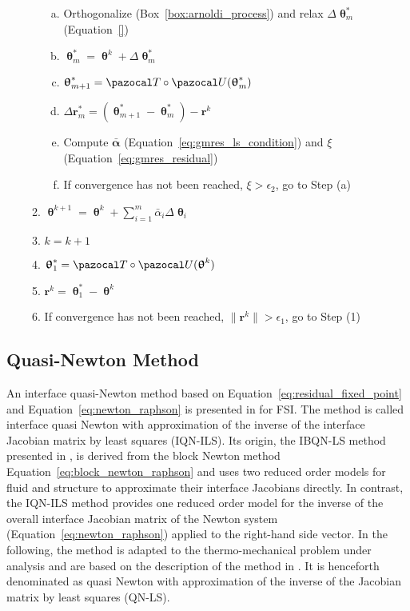 \begin{framedbox}[htbp]
\begin{center}
\begin{minipage}{0.9\textwidth}
\begin{enumerate}[(i)]
\begin{enumerate}[(1)]
\begin{enumerate}[(a)]
        \item Orthogonalize (Box~\ref{box:arnoldi_process}) and relax \(\Delta \bm\uptheta^*_m\) (Equation~\eqref{})
        \item \(\bm\uptheta^*_m = \bm\uptheta^k + \Delta\bm\uptheta^*_m\)
        \item \(\bm \uptheta^*_{m+1} = \pazocal T \circ \pazocal U(\bm \uptheta^*_m)\)
        \item \(\Delta \mathbf r^*_m = (\bm\uptheta^*_{m+1} - \bm \uptheta^*_m) - \mathbf r^k\)
        \item Compute \(\bar{\mathbf\alpha}\) (Equation~\eqref{eq:gmres_ls_condition}) and \(\xi\) (Equation~\eqref{eq:gmres_residual})
        \item If convergence has not been reached, \(\xi>\epsilon_2\), go to Step (a)
      \end{enumerate}
    \item \(\bm\uptheta^{k+1} = \bm\uptheta^k + \sum_{i=1}^m \bar{\alpha}_i \Delta\bm\uptheta_i\)
    \item \(k=k+1\)
    \item \(\bm\uptheta^*_1 = \pazocal T\circ \pazocal U(\bm\uptheta^{k})\)
    \item \(\mathbf r^k = \bm\uptheta^*_1 - \bm \uptheta^k\)
    \item If convergence has not been reached, \(\|\mathbf r^k\| > \epsilon_1\), go to Step (1)
    \end{enumerate}
    \end{enumerate}
    \end{minipage}
  \end{center}
\end{framedbox}


\subsection{Quasi-Newton Method}

An interface quasi-Newton method based on Equation~\eqref{eq:residual_fixed_point} and Equation~\eqref{eq:newton_raphson} is presented in \cite{degroote_joris_development_2010} for FSI.
The method is called interface quasi Newton with approximation of the inverse of the interface Jacobian matrix by least squares (IQN-ILS).
Its origin, the IBQN-LS method presented in \cite{vierendeels_implicit_2007}, is derived from the block Newton method Equation~\eqref{eq:block_newton_raphson} and uses two reduced order models for fluid and structure to approximate their interface Jacobians directly.
In contrast, the IQN-ILS method provides one reduced order model for the inverse of the overall interface Jacobian matrix of the Newton system (Equation~\eqref{eq:newton_raphson}) applied to the right-hand side vector.
In the following, the method is adapted to the thermo-mechanical problem under analysis and are based on the description of the method in \cite{gatzhammer_efficient_2014}.
It is henceforth denominated as quasi Newton with approximation of the inverse of the Jacobian matrix by least squares (QN-LS).

